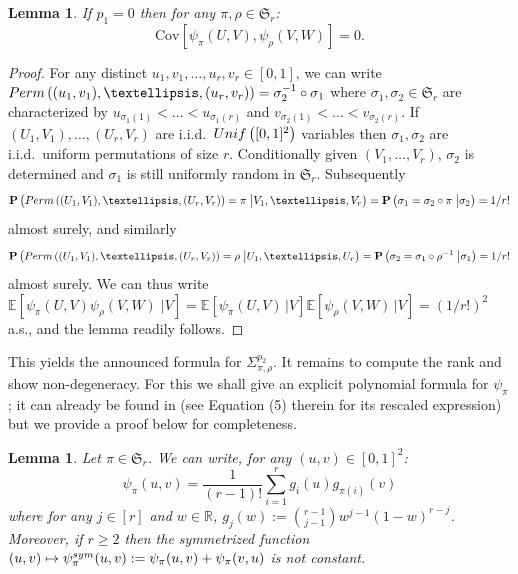 \documentclass{article}
\newtheorem{lem}[theorem]{Lemma}
\theoremstyle{remark}
\def\R{\mathbb{R}}
\newcommand{\mean}[1]{\mathbb{E}\left[#1\right]}
\newcommand{\prob}[1]{\mathbf{P}\left(#1\right)}
\newcommand{\cov}[2]{\mathrm{Cov}\left[#1,#2\right]}
\newcommand{\Unif}[1]{{\rm Unif}\left(#1\right)}
\def\S{\mathfrak{S}}
\def\carre{[0,1]^2}
\newcommand{\perm}[1]{{\rm Perm}\left(#1\right)}
\begin{document}
\begin{lem}\label{lem: pattern null cov t-cyclic}
    If $p_1=0$ then for any $\pi,\rho\in\S_r$:
    \begin{equation*}
        \cov{\psi_\pi(U,V)}{\psi_\rho(V,W)} = 0.
    \end{equation*}
\end{lem}

\begin{proof}
    For any distinct $u_1,v_1,\dots,u_r,v_r\in[0,1]$, we can write $\perm{(u_1,v_1),\dots,(u_r,v_r)}=\sigma_2^{-1}\circ\sigma_1$
    where $\sigma_1,\sigma_2\in\S_r$ are characterized by $u_{\sigma_1(1)}<\dots<u_{\sigma_1(r)}$ and $v_{\sigma_2(1)}<\dots<v_{\sigma_2(r)}$.
    If $(U_1,V_1),\dots,(U_r,V_r)$ are i.i.d.~$\Unif{\carre}$ variables then $\sigma_1,\sigma_2$ are i.i.d.~uniform permutations of size $r$.
    Conditionally given $(V_1,\dots,V_r)$, $\sigma_2$ is determined and $\sigma_1$ is still uniformly random in $\S_r$.
    Subsequently 
    \begin{equation*}
        \prob{\perm{(U_1,V_1),\dots,(U_r,V_r)}=\pi \;\big| V_1,\dots,V_r} 
        = \prob{\sigma_1 = \sigma_2\circ\pi \;\big| \sigma_2}
        = 1/r!
    \end{equation*}
    almost surely, and similarly
    \begin{equation*}
        \prob{\perm{(U_1,V_1),\dots,(U_r,V_r)}=\rho \;\big| U_1,\dots,U_r} 
        = \prob{\sigma_2 = \sigma_1\circ\rho^{-1} \;\big| \sigma_1}
        = 1/r!
    \end{equation*}
    almost surely. 
    We can thus write $\mean{\psi_\pi(U,V)\psi_\rho(V,W) \;\big| V} = \mean{\psi_\pi(U,V)\,\big| V}\mean{\psi_\rho(V,W) \,\big| V} = (1/r!)^2$ a.s., and the lemma readily follows.
\end{proof}

This yields the announced formula for $\Sigma_{\pi,\rho}^{p_2}$.
It remains to compute the rank and show non-degeneracy.
For this we shall give an explicit polynomial formula for $\psi_\pi$; it can already be found in \cite{JNZ15} (see Equation (5) therein for its rescaled expression) but we provide a proof below for completeness.

\begin{lem}\label{lem: study varphi}
    Let $\pi\in\S_r$.
    We can write, for any $(u,v)\in\carre$:
    \begin{equation*}
        \psi_\pi(u,v) = \frac{1}{(r-1)!}\sum_{i=1}^r g_i(u) g_{\pi(i)}(v)
    \end{equation*}
    where for any $j\in[r]$ and $w\in\R$, $g_j(w) := \binom{r-1}{j-1}w^{j-1}(1-w)^{r-j}$.
    Moreover, if $r\ge2$ then the symmetrized function $(u,v)\mapsto\psi^{\rm sym}_\pi(u,v):=\psi_\pi(u,v)+\psi_\pi(v,u)$ is not constant.
\end{lem}
\end{document}
